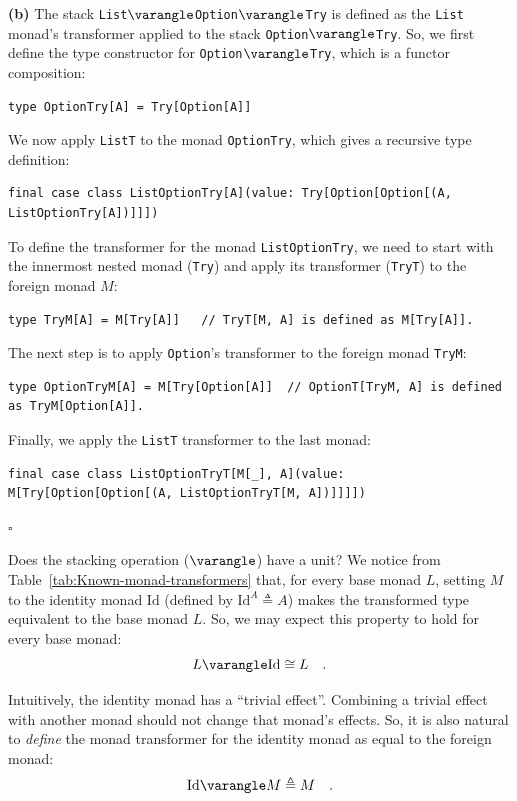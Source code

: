 \textbf{(b)} The stack \lstinline!List!$\varangle$\lstinline!Option!$\varangle$\lstinline!Try!
is defined as the \lstinline!List! monad\textsf{'}s transformer applied to
the stack \lstinline!Option!$\varangle$\lstinline!Try!. So, we
first define the type constructor for \lstinline!Option!$\varangle$\lstinline!Try!,
which is a functor composition:
\begin{lstlisting}
type OptionTry[A] = Try[Option[A]]
\end{lstlisting}
We now apply \lstinline!ListT! to the monad \lstinline!OptionTry!,
which gives a recursive type definition:
\begin{lstlisting}
final case class ListOptionTry[A](value: Try[Option[Option[(A, ListOptionTry[A])]]])
\end{lstlisting}

To define the transformer for the monad \lstinline!ListOptionTry!,
we need to start with the innermost nested monad (\lstinline!Try!)
and apply its transformer (\lstinline!TryT!) to the foreign monad
$M$:
\begin{lstlisting}
type TryM[A] = M[Try[A]]   // TryT[M, A] is defined as M[Try[A]].
\end{lstlisting}
The next step is to apply \lstinline!Option!\textsf{'}s transformer to the
foreign monad \lstinline!TryM!:
\begin{lstlisting}
type OptionTryM[A] = M[Try[Option[A]]  // OptionT[TryM, A] is defined as TryM[Option[A]].
\end{lstlisting}
Finally, we apply the \lstinline!ListT! transformer to the last monad:
\begin{lstlisting}
final case class ListOptionTryT[M[_], A](value: M[Try[Option[Option[(A, ListOptionTryT[M, A])]]]])
\end{lstlisting}
$\square$

Does the stacking operation ($\varangle$) have a unit? We notice
from Table~\ref{tab:Known-monad-transformers} that, for every base
monad $L$, setting $M$ to the identity monad $\text{Id}$ (defined
by $\text{Id}^{A}\triangleq A$) makes the transformed type equivalent
to the base monad $L$. So, we may expect this property to hold for
every base monad:
\[
L\varangle\text{Id}\cong L\quad.
\]

Intuitively, the identity monad has a \textsf{``}trivial effect\textsf{''}. Combining
a trivial effect with another monad should not change that monad\textsf{'}s
effects. So, it is also natural to \emph{define} the monad transformer
for the identity monad as equal to the foreign monad:
\[
\text{Id}\varangle M\triangleq M\quad.
\]

